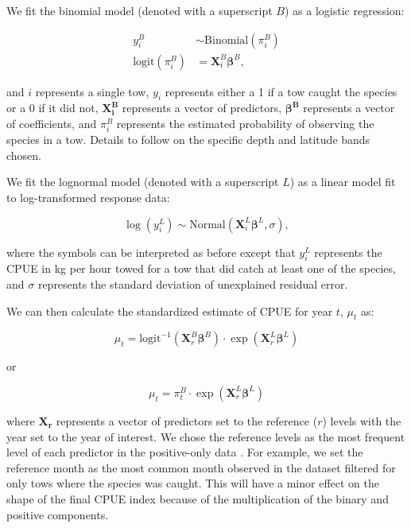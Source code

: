 \documentclass[11pt]{book}\usepackage[]{graphicx}\usepackage[]{color}
\begin{document}
We fit the binomial model (denoted with a superscript $B$) as a logistic
regression:

\begin{align}
  y_i^B &\sim \mathrm{Binomial}(\pi_i^B)\\
  \mathrm{logit}\left(\pi_i^B\right) &= \bm{X}_i^B \bm{\beta}^B,
\end{align}

and $i$ represents a single tow, $y_i$ represents either a 1 if a tow caught the
species or a 0 if it did not, $\bm{X^B_i}$ represents a vector of predictors,
$\bm{\beta^B}$ represents a vector of coefficients, and $\pi_i^B$ represents the
estimated probability of observing the species in a tow. Details to follow on
the specific depth and latitude bands chosen.

We fit the lognormal model (denoted with a superscript $L$) as a linear model
fit to log-transformed response data:

\begin{equation}
  \log \left(y_i^L\right) \sim \mathrm{Normal} \left(\bm{X}_i^L \bm{\beta}^L, \sigma \right),
\end{equation}

where the symbols can be interpreted as before except that $y_i^L$ represents
the CPUE in kg per hour towed for a tow that did catch at least one of the
species, and $\sigma$ represents the standard deviation of unexplained residual
error.

We can then calculate the standardized estimate of CPUE for year $t$, $\mu_t$ as:

\begin{equation}
  \mu_t = \mathrm{logit}^{-1} \left(\bm{X}_r^B
    \bm{\beta}^B \right) \cdot \exp \left(\bm{X}_r^L \bm{\beta}^L \right)
\end{equation}

or

\begin{equation}
  \mu_t = \pi_t^B \cdot \exp \left(\bm{X}_r^L \bm{\beta}^L \right)
\end{equation}

where $\bm{X_r}$ represents a vector of predictors set to the reference ($r$)
levels with the year set to the year of interest. We chose the reference levels
as the most frequent level of each predictor in the positive-only data
\citep{maunder2004}. For example, we set the reference month as the most common
month observed in the dataset filtered for only tows where the species was
caught. This will have a minor effect on the shape of the final CPUE index
because of the multiplication of the binary and positive components.
\end{document}
